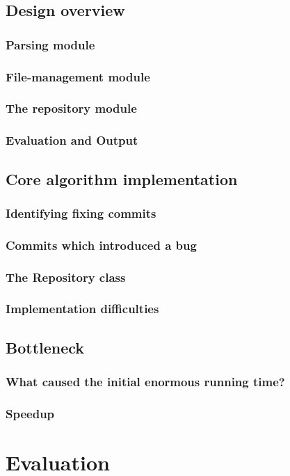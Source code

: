 \documentclass[12pt,twoside,notitlepage]{report}
\begin{document}
\section{Design overview}
\subsection{Parsing module}
\subsection{File-management module}
\subsection{The repository module}
\subsection{Evaluation and Output}
\section{Core algorithm implementation}
\subsection{Identifying fixing commits}
\subsection{Commits which introduced a bug}
\subsection{The Repository class}
\subsection{Implementation difficulties}
\section{Bottleneck}
\subsection{What caused the initial enormous running time?}
\subsection{Speedup}

\chapter{Evaluation}
\end{document}
